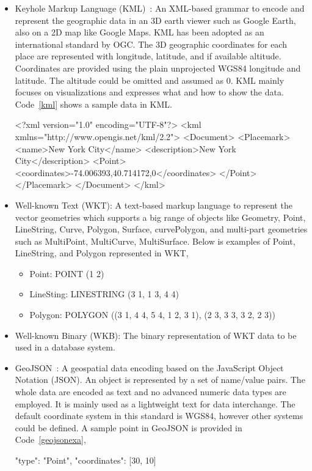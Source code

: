 \documentclass[a4paper,12pt]{article}
\begin{document}
\begin{itemize}
\item Keyhole Markup Language (KML)~\cite{kml}: An XML-based grammar to encode and represent the geographic data in an 3D earth viewer such as Google Earth, also on a 2D map like Google Maps. KML has been adopted as an international standard by OGC. The 3D geographic coordinates for each place are represented with longitude, latitude, and if available altitude. Coordinates are provided using the plain unprojected WGS84 longitude and latitude. The altitude could be omitted and assumed as $0$. KML mainly focuses on visualizations and expresses what and how to show the data. Code~\ref{kml} shows a sample data in KML. 
\vspace{10px}
\begin{fakeXML}[label=kml,caption=A simple KML example representing a Point]
<?xml version="1.0" encoding="UTF-8"?>
<kml xmlns="http://www.opengis.net/kml/2.2">
<Document>
<Placemark>
  <name>New York City</name>
  <description>New York City</description>
  <Point>
    <coordinates>-74.006393,40.714172,0</coordinates>
  </Point>
</Placemark>
</Document>
</kml>
\end{fakeXML} 
\vspace{10px}
\item Well-known Text (WKT): A text-based markup language to represent the vector geometries which supports a big range of objects like Geometry, Point, LineString, Curve, Polygon, Surface, curvePolygon, and multi-part geometries such as MultiPoint, MultiCurve, MultiSurface. Below is examples of Point, LineString, and Polygon represented in WKT, 
\begin{itemize}
\item Point: POINT (1 2)
\item LineSting: LINESTRING (3 1, 1 3, 4 4)
\item Polygon: POLYGON ((3 1, 4 4, 5 4, 1 2, 3 1),
			(2 3, 3 3, 3 2, 2 3))
\end{itemize}
\item Well-known Binary (WKB): The binary representation of WKT data to be used in a database system.
\item GeoJSON~\cite{www/geojson}: A geospatial data encoding based on the JavaScript Object Notation (JSON). An object is represented by a set of name/value pairs. The whole data are encoded as text and no advanced numeric data types are employed. It is mainly used as a lightweight text for data interchange. The default coordinate system in this standard is WGS84, however other systems could be defined. A sample point in GeoJSON is provided in Code~\ref{geojsonexa},
\vspace{10px} 
\begin{fakeXML}[label=geojsonexa,caption=A simple GeoJSON example representing a Point]
{
    "type": "Point", 
    "coordinates": [30, 10]
}
\end{fakeXML}
\end{itemize}
\vspace{10px}
\end{document}
